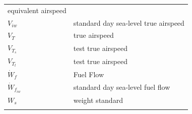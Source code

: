 \documentclass[
]{book}
\begin{document}
\begin{longtable}[]{@{}ll@{}}
\begin{minipage}[t]{0.80\columnwidth}
equivalent airspeed\strut
\end{minipage}\tabularnewline
\begin{minipage}[t]{0.14\columnwidth}\raggedright
\(V_{iw}\)\strut
\end{minipage} & \begin{minipage}[t]{0.80\columnwidth}\raggedright
standard day sea-level true airspeed\strut
\end{minipage}\tabularnewline
\begin{minipage}[t]{0.14\columnwidth}\raggedright
\(V_T\)\strut
\end{minipage} & \begin{minipage}[t]{0.80\columnwidth}\raggedright
true airspeed\strut
\end{minipage}\tabularnewline
\begin{minipage}[t]{0.14\columnwidth}\raggedright
\(V_{T_s}\)\strut
\end{minipage} & \begin{minipage}[t]{0.80\columnwidth}\raggedright
test true airspeed\strut
\end{minipage}\tabularnewline
\begin{minipage}[t]{0.14\columnwidth}\raggedright
\(V_{T_t}\)\strut
\end{minipage} & \begin{minipage}[t]{0.80\columnwidth}\raggedright
test true airspeed\strut
\end{minipage}\tabularnewline
\begin{minipage}[t]{0.14\columnwidth}\raggedright
\(\dot{W}_f\)\strut
\end{minipage} & \begin{minipage}[t]{0.80\columnwidth}\raggedright
Fuel Flow\strut
\end{minipage}\tabularnewline
\begin{minipage}[t]{0.14\columnwidth}\raggedright
\(\dot{W}_{f_{iw}}\)\strut
\end{minipage} & \begin{minipage}[t]{0.80\columnwidth}\raggedright
standard day sea-level fuel flow\strut
\end{minipage}\tabularnewline
\begin{minipage}[t]{0.14\columnwidth}\raggedright
\(W_s\)\strut
\end{minipage} & \begin{minipage}[t]{0.80\columnwidth}\raggedright
weight standard\strut
\end{minipage}\tabularnewline
\begin{minipage}[t]{0.14\columnwidth}\raggedright

\end{minipage}
\end{longtable}
\end{document}
